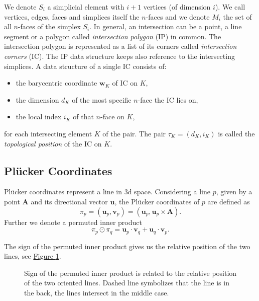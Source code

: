 \documentclass{elsarticle}
\newcommand{\fig}[1]{\hyperref[#1]{Figure \ref{#1}}}
\newcommand{\figpath}{figures/}
\def\vc#1{\mathbf{\boldsymbol{#1}}}     %
\newcommand{\plucker}{Pl\"{u}cker }
\newcommand{\nface}{$n$-face }
\newcommand{\nfaces}{$n$-faces }
\begin{document}
We denote $S_i$ a simplicial element with $i+1$ vertices (of dimension $i$). We call vertices, edges, faces and simplices itself the \nfaces and we denote
$M_i$ the set of all \nfaces of the simplex $S_i$.
In general, an intersection can be a point, a line segment or a polygon called \emph{intersection polygon} (IP) in common.
The intersection polygon is represented as a list of its corners called \emph{intersection corners} (IC). The IP data structure keeps also 
reference to the intersecting simplices. A data structure of a single IC consists of:
\begin{itemize}
 \item the barycentric coordinate $\vc w_K$ of IC on $K$,
 \item the dimension $d_K$ of the most specific \nface the IC lies on,
 \item the local index $i_K$ of that \nface on $K$,
\end{itemize}
for each intersecting element $K$ of the pair. The pair $\tau_K = (d_K, i_K)$
is called the \emph{topological position} of the IC on $K$.


\subsection{\plucker Coordinates}
\plucker coordinates represent a line in 3d space.
Considering a line $p$, given by a point $\vc A$ and its directional vector $\vc{u}$, 
the \plucker coordinates of $p$ are defined as
\[ \pi_p = (\vc{u}_p, \vc{v}_p) = (\vc{u}_p, \vc{u}_p\times \vc A). \]
Further we denote a permuted inner product
\[\pi_p \odot \pi_q = \vc{u}_p\cdot \vc{v}_q + \vc{u}_q \cdot \vc{v}_p. \]

The sign of the permuted inner product gives us the relative position of the two lines, 
see \fig{fig:plucker_products}.


\begin{figure}[!htb]
    \centering    
    \caption{Sign of the permuted inner product is related to the relative position of the two oriented lines.          
            Dashed line symbolizes that the line is in the back, the lines intersect in the middle case.
    }
    \label{fig:plucker_products}
\end{figure}
\end{document}

